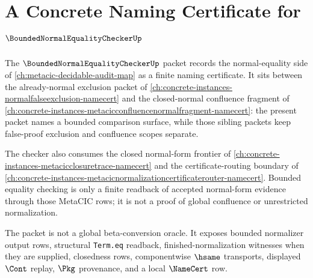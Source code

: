 \chapter{A Concrete Naming Certificate for $\BoundedNormalEqualityCheckerUp$}
\label{ch:concrete-instances-bounded-normal-equality-checker-namecert}

The $\BoundedNormalEqualityCheckerUp$ packet records the normal-equality side of
\autoref{ch:metacic-decidable-audit-map} as a finite naming certificate. It
sits between the already-normal exclusion packet of
\autoref{ch:concrete-instances-normalfalseexclusion-namecert} and the
closed-normal confluence fragment of
\autoref{ch:concrete-instances-metacicconfluencenormalfragment-namecert}: the
present packet names a bounded comparison surface, while those sibling packets
keep false-proof exclusion and confluence scopes separate.

The checker also consumes the closed normal-form frontier of
\autoref{ch:concrete-instances-metacicclosuretrace-namecert} and the
certificate-routing boundary of
\autoref{ch:concrete-instances-metacicnormalizationcertificaterouter-namecert}.
Bounded equality checking is only a finite readback of accepted normal-form
evidence through those MetaCIC rows; it is not a proof of global confluence or
unrestricted normalization.

The packet is not a global beta-conversion oracle. It exposes bounded
normalizer output rows, structural \texttt{Term.eq} readback,
finished-normalization witnesses when they are supplied, closedness rows,
componentwise $\hsame$ transports, displayed $\Cont$ replay, $\Pkg$
provenance, and a local $\NameCert$ row.

